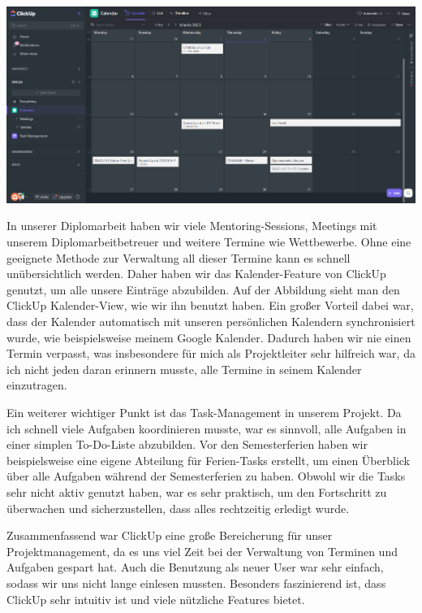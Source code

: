 \includegraphics[width=1\textwidth]{./pics/clickup-calender-view.png}

In unserer Diplomarbeit haben wir viele Mentoring-Sessions,
Meetings mit unserem Diplomarbeitbetreuer und weitere
Termine wie Wettbewerbe. Ohne eine geeignete Methode zur
Verwaltung all dieser Termine kann es schnell
unübersichtlich werden. Daher haben wir das Kalender-Feature
von ClickUp genutzt, um alle unsere Einträge abzubilden. Auf der Abbildung sieht man den ClickUp Kalender-View, wie wir ihn benutzt haben. Ein großer Vorteil dabei war, dass der Kalender automatisch
mit unseren persönlichen Kalendern synchronisiert wurde, wie
beispielsweise meinem Google Kalender. Dadurch haben wir nie
einen Termin verpasst, was insbesondere für mich als
Projektleiter sehr hilfreich war, da ich nicht jeden daran
erinnern musste, alle Termine in seinem Kalender
einzutragen.

Ein weiterer wichtiger Punkt ist das Task-Management in
unserem Projekt. Da ich schnell viele Aufgaben koordinieren
musste, war es sinnvoll, alle Aufgaben in einer simplen
To-Do-Liste abzubilden. Vor den Semesterferien haben wir
beispielsweise eine eigene Abteilung für Ferien-Tasks
erstellt, um einen Überblick über alle Aufgaben während der
Semesterferien zu haben. Obwohl wir die Tasks sehr nicht
aktiv genutzt haben, war es sehr praktisch, um den
Fortschritt zu überwachen und sicherzustellen, dass alles
rechtzeitig erledigt wurde.

Zusammenfassend war ClickUp eine große Bereicherung für unser Projektmanagement, da es uns viel Zeit bei der Verwaltung von Terminen und Aufgaben gespart hat. Auch die Benutzung als neuer User war sehr einfach, sodass wir uns nicht lange einlesen mussten. Besonders faszinierend ist, dass ClickUp sehr intuitiv ist und viele nützliche Features bietet.


